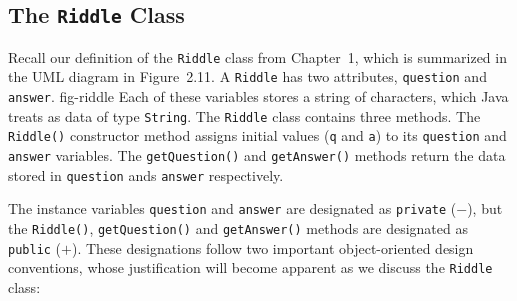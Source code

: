 \subsection{The {\tt Riddle} Class}


\noindent Recall our definition of the {\tt Riddle} class from
Chapter~1, which is summarized in the UML diagram in Figure~2.11. A
{\tt Riddle} has two attributes, {\tt question} and {\tt answer}.
{fig-riddle}
Each
of these variables stores a string of characters, which Java treats as
data of type {\tt String}.  The {\tt Riddle} class contains three
methods.  The {\tt Riddle()} constructor method assigns initial values
({\tt q} and {\tt a}) to its {\tt question} and {\tt answer}
variables.  The {\tt getQuestion()} and {\tt getAnswer()} methods
return the data stored in {\tt question} ands {\tt answer}
respectively.




The instance variables {\tt question} and {\tt answer} are designated
as {\tt private} ($-$), but the {\tt Riddle()}, {\tt getQuestion()}
and {\tt getAnswer()} methods are designated as {\tt public}
($+$). These designations follow two important object-oriented design
conventions, whose justification will become apparent as we
discuss the {\tt Riddle} class: 




